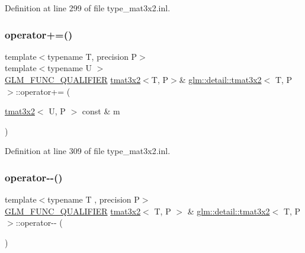 Definition at line 299 of file type\+\_\+mat3x2.\+inl.

\mbox{\label{structglm_1_1detail_1_1tmat3x2_aeb063f61f41be8039bf8e5b40b40ae50}} 
\subsubsection{\texorpdfstring{operator+=()}{operator+=()}\hspace{0.1cm}{\footnotesize\ttfamily [4/4]}}
{\footnotesize\ttfamily template$<$typename T, precision P$>$ \\
template$<$typename U $>$ \\
\hyperlink{setup_8hpp_a33fdea6f91c5f834105f7415e2a64407}{G\+L\+M\+\_\+\+F\+U\+N\+C\+\_\+\+Q\+U\+A\+L\+I\+F\+I\+ER} \hyperlink{structglm_1_1detail_1_1tmat3x2}{tmat3x2}$<$T, P$>$\& \hyperlink{structglm_1_1detail_1_1tmat3x2}{glm\+::detail\+::tmat3x2}$<$ T, P $>$\+::operator+= (\begin{DoxyParamCaption}\item[{\hyperlink{structglm_1_1detail_1_1tmat3x2}{tmat3x2}$<$ U, P $>$ const \&}]{m }\end{DoxyParamCaption})}



Definition at line 309 of file type\+\_\+mat3x2.\+inl.

\mbox{\label{structglm_1_1detail_1_1tmat3x2_aee4f32e3b1bd8b4e9def345a530b3499}} 
\subsubsection{\texorpdfstring{operator-\/-\/()}{operator--()}\hspace{0.1cm}{\footnotesize\ttfamily [1/2]}}
{\footnotesize\ttfamily template$<$typename T , precision P$>$ \\
\hyperlink{setup_8hpp_a33fdea6f91c5f834105f7415e2a64407}{G\+L\+M\+\_\+\+F\+U\+N\+C\+\_\+\+Q\+U\+A\+L\+I\+F\+I\+ER} \hyperlink{structglm_1_1detail_1_1tmat3x2}{tmat3x2}$<$ T, P $>$ \& \hyperlink{structglm_1_1detail_1_1tmat3x2}{glm\+::detail\+::tmat3x2}$<$ T, P $>$\+::operator-\/-\/ (\begin{DoxyParamCaption}{ }\end{DoxyParamCaption})}



